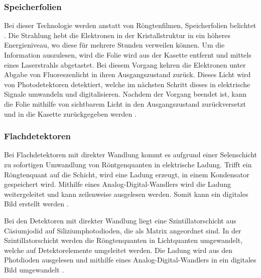 \subsubsection{Speicherfolien}
\label{subsubsec:Speicherfolien}
Bei dieser Technologie werden anstatt von Röngtenfilmen, Speicherfolien belichtet \cite{Medizinische Physik}. Die Strahlung hebt die Elektronen in der
Kristallstruktur in ein höheres Energieniveau, wo diese für mehrere Stunden verweilen können. Um die Information auszulesen, wird 
die Folie wird aus der Kasette entfernt und mittels eines Laserstrahls abgetastet. Bei diesem Vorgang kehren die Elektronen unter
Abgabe von Fluoreszenlicht in ihren Ausgangszustand zurück. Dieses Licht wird von Photodetektoren detektiert, welche
im nächsten Schritt dieses in elektrische Signale umwandeln und digitalisieren. Nachdem der Vorgang beendet ist, kann die Folie 
mithilfe von sichtbarem Licht in den Ausgangszustand zurückversetzt und in die Kasette zurückgegeben werden \cite{Medizintechnik}.


\subsubsection{Flachdetektoren}
\label{subsubsec:Flachdetektoren}

Bei Flachdetektoren mit direkter Wandlung kommt es aufgrund einer Selenschicht zu sofortigen Umwandlung von Röntgenquanten in
elektrische Ladung. Trifft ein Röngtenquant auf die Schicht, wird eine Ladung erzeugt, in einem Kondensator gespeichert wird. Mithilfe
eines Analog-Digital-Wandlers wird die Ladung weitergeleitet und kann zeilenweise ausgelesen werden. Somit kann ein digitales Bild
erstellt werden \cite{Artikel}. 

Bei den Detektoren mit direkter Wandlung liegt eine Szintillatorschicht aus Cäsiumjodid auf Siliziumphotodioden, die als Matrix
angeordnet sind. In der Szintillatorschicht werden die Röngtenquanten in Lichtquanten umgewandelt, welche auf Detektorelemente umgeleitet 
werden. Die Ladung wird aus den Photdioden ausgelesen und mithilfe eines Analog-Digital-Wandlers in ein digitales Bild umgewandelt
 \cite{Artikel}.





